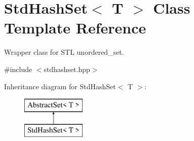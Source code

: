 \hypertarget{class_std_hash_set}{\section{Std\-Hash\-Set$<$ T $>$ Class Template Reference}
\label{class_std_hash_set}
}


Wrapper class for S\-T\-L unordered\-\_\-set.  




{\ttfamily \#include $<$stdhashset.\-hpp$>$}

Inheritance diagram for Std\-Hash\-Set$<$ T $>$\-:\begin{figure}[H]
\begin{center}
\leavevmode
\includegraphics[height=2.000000cm]{class_std_hash_set}
\end{center}
\end{figure}
